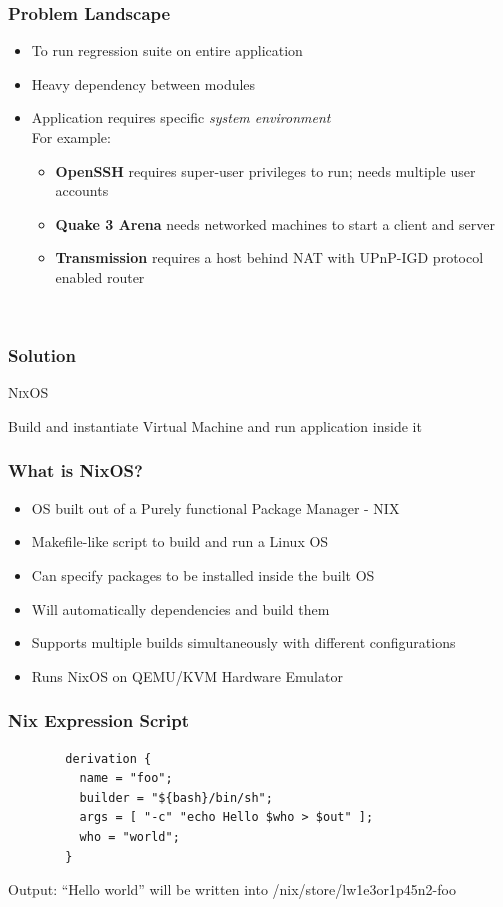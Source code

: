 \documentclass[compress,red]{beamer}
\begin{document}
\frame
{
	\frametitle{Problem Landscape}
	\begin{itemize}
		\pause
		\item To run regression suite on entire application
		\pause
		\item Heavy dependency between modules
		\pause
		\item Application requires specific \textit{system environment} \\
			  For example: 
			  \begin{itemize}
			  	\pause
			  	\item \textbf{OpenSSH} requires super-user privileges to run; needs multiple user accounts
			  	\pause
				\item \textbf{Quake 3 Arena} needs networked machines to start a client and server
				\pause
				\item \textbf{Transmission} requires a host behind NAT with UPnP-IGD protocol enabled router
			  \end{itemize}
	\end{itemize}
	\ \\
	\pause
}

\frame
{
	\frametitle{Solution}
	\begin{center} \Large{ \textsc{NixOS} }  \end{center}
	Build and instantiate Virtual Machine and run application inside it
}
\frame
{
	\frametitle{What is NixOS?}
	\begin{itemize}
		\pause
		\item OS built out of a Purely functional Package Manager - NIX
		\pause
		\item Makefile-like script to build and run a Linux OS
		\pause
		\item Can specify packages to be installed inside the built OS
		\pause
		\item Will automatically dependencies and build them
		\pause
		\item Supports multiple builds simultaneously with different configurations
		\pause
		\item Runs NixOS on QEMU/KVM Hardware Emulator
	\end{itemize}
}

\begin{frame}[fragile]

	\frametitle{Nix Expression Script}
	\begin{verbatim}
		derivation {
		  name = "foo";
		  builder = "${bash}/bin/sh";
		  args = [ "-c" "echo Hello $who > $out" ];
		  who = "world";
		}
	\end{verbatim}

Output: ``Hello world'' will be written into /nix/store/lw1e3or1p45n2-foo
\end{frame}
\end{document}
